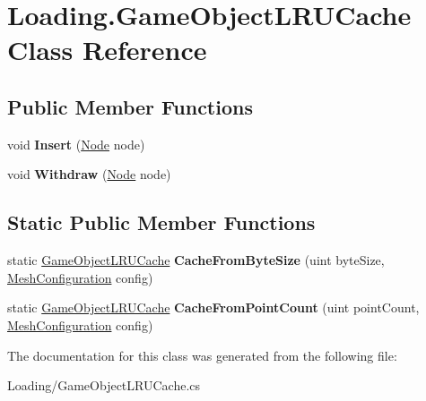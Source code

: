 \hypertarget{class_loading_1_1_game_object_l_r_u_cache}{}\section{Loading.\+Game\+Object\+L\+R\+U\+Cache Class Reference}
\label{class_loading_1_1_game_object_l_r_u_cache}
\subsection*{Public Member Functions}
\begin{DoxyCompactItemize}
\item 
\mbox{\label{class_loading_1_1_game_object_l_r_u_cache_a5b9fce889473f38bab25a33d1679801f}} 
void {\bfseries Insert} (\hyperlink{class_cloud_data_1_1_node}{Node} node)
\item 
\mbox{\label{class_loading_1_1_game_object_l_r_u_cache_ac6cd29fdf26f70d74c205b02f150367d}} 
void {\bfseries Withdraw} (\hyperlink{class_cloud_data_1_1_node}{Node} node)
\end{DoxyCompactItemize}
\subsection*{Static Public Member Functions}
\begin{DoxyCompactItemize}
\item 
\mbox{\label{class_loading_1_1_game_object_l_r_u_cache_a2e91558444a80a8240d03218fbc33e63}} 
static \hyperlink{class_loading_1_1_game_object_l_r_u_cache}{Game\+Object\+L\+R\+U\+Cache} {\bfseries Cache\+From\+Byte\+Size} (uint byte\+Size, \hyperlink{class_object_creation_1_1_mesh_configuration}{Mesh\+Configuration} config)
\item 
\mbox{\label{class_loading_1_1_game_object_l_r_u_cache_af42e0f3663aaea70de0e054c2111ffcf}} 
static \hyperlink{class_loading_1_1_game_object_l_r_u_cache}{Game\+Object\+L\+R\+U\+Cache} {\bfseries Cache\+From\+Point\+Count} (uint point\+Count, \hyperlink{class_object_creation_1_1_mesh_configuration}{Mesh\+Configuration} config)
\end{DoxyCompactItemize}


The documentation for this class was generated from the following file\+:\begin{DoxyCompactItemize}
\item 
Loading/Game\+Object\+L\+R\+U\+Cache.\+cs\end{DoxyCompactItemize}
